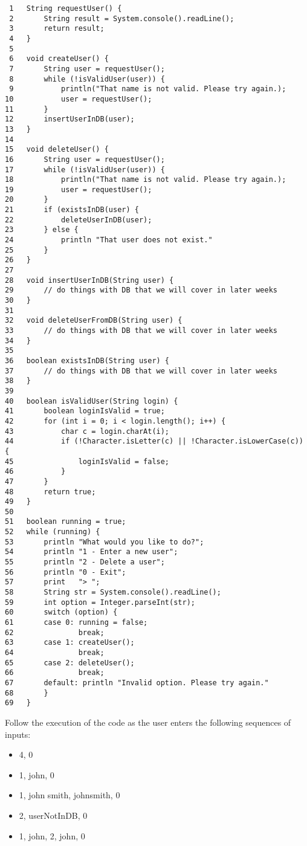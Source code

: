 \documentclass{article}
\begin{document}
\begin{verbatim}
 1   String requestUser() {
 2       String result = System.console().readLine();
 3       return result;
 4   }
 5   
 6   void createUser() {
 7       String user = requestUser();
 8       while (!isValidUser(user)) {
 9           println("That name is not valid. Please try again.);
10           user = requestUser();
11       }
12       insertUserInDB(user);
13   }
14   
15   void deleteUser() {
16       String user = requestUser();
17       while (!isValidUser(user)) {
18           println("That name is not valid. Please try again.);
19           user = requestUser();
20       }
21       if (existsInDB(user) {
22           deleteUserInDB(user);
23       } else {
24           println "That user does not exist."
25       }
26   }
27   
28   void insertUserInDB(String user) {
29       // do things with DB that we will cover in later weeks
30   }
31   
32   void deleteUserFromDB(String user) {
33       // do things with DB that we will cover in later weeks
34   }
35   
36   boolean existsInDB(String user) {
37       // do things with DB that we will cover in later weeks
38   }
39   
40   boolean isValidUser(String login) {
41       boolean loginIsValid = true;
42       for (int i = 0; i < login.length(); i++) {
43           char c = login.charAt(i);
44           if (!Character.isLetter(c) || !Character.isLowerCase(c)) {
45               loginIsValid = false;
46           }
47       }
48       return true;
49   }
50   
51   boolean running = true;
52   while (running) { 
53       println "What would you like to do?";
54       println "1 - Enter a new user";
55       println "2 - Delete a user";
56       println "0 - Exit";
57       print   "> ";
58       String str = System.console().readLine();
59       int option = Integer.parseInt(str);
60       switch (option) {
61       case 0: running = false;
62               break;
63       case 1: createUser();
64               break;
65       case 2: deleteUser();
66               break;
67       default: println "Invalid option. Please try again."
68       }
69   }
\end{verbatim}

Follow the execution of the code as the user enters the following
sequences of inputs:

\begin{itemize}
\item 4, 0
\item 1, john, 0
\item 1, john smith, johnsmith, 0
\item 2, userNotInDB, 0
\item 1, john, 2, john, 0
\end{itemize}
\end{document}
